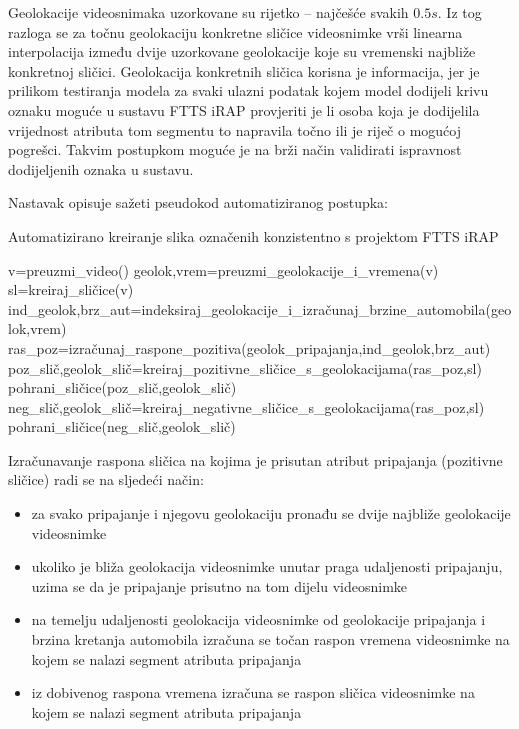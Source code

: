 \documentclass[times, utf8, diplomski, numeric]{fer}
\begin{document}
Geolokacije videosnimaka uzorkovane su rijetko -- najčešće svakih $0.5s$. 
Iz tog razloga se za točnu geolokaciju konkretne sličice videosnimke vrši linearna interpolacija između dvije uzorkovane geolokacije koje su vremenski najbliže konkretnoj sličici.
Geolokacija konkretnih sličica korisna je informacija, jer je prilikom testiranja modela za svaki ulazni podatak kojem model dodijeli krivu oznaku moguće u sustavu FTTS iRAP provjeriti je li osoba koja je dodijelila vrijednost atributa tom segmentu to napravila točno ili je riječ o mogućoj pogrešci. 
Takvim postupkom moguće je na brži način validirati ispravnost dodijeljenih oznaka u sustavu.

Nastavak opisuje sažeti pseudokod automatiziranog postupka:
\begin{algorithm}[H]
\caption{Automatizirano kreiranje slika označenih konzistentno s projektom FTTS iRAP}
\label{alg:dataset_creator}
\begin{algorithmic}
\STATE v=preuzmi\_video()
\STATE geolok,vrem=preuzmi\_geolokacije\_i\_vremena(v)
\STATE sl=kreiraj\_sličice(v)
\STATE ind\_geolok,brz\_aut=indeksiraj\_geolokacije\_i\_izračunaj\_brzine\_automobila(geolok,vrem)
\STATE ras\_poz=izračunaj\_raspone\_pozitiva(geolok\_pripajanja,ind\_geolok,brz\_aut)
\STATE poz\_slič,geolok\_slič=kreiraj\_pozitivne\_sličice\_s\_geolokacijama(ras\_poz,sl)
\STATE pohrani\_sličice(poz\_slič,geolok\_slič)
\STATE neg\_slič,geolok\_slič=kreiraj\_negativne\_sličice\_s\_geolokacijama(ras\_poz,sl)
\STATE pohrani\_sličice(neg\_slič,geolok\_slič)
\ENDWHILE
\end{algorithmic}
\end{algorithm}

\noindent Izračunavanje raspona sličica na kojima je prisutan atribut pripajanja (pozitivne sličice) radi se na sljedeći način:
\begin{itemize}
 \item za svako pripajanje i njegovu geolokaciju pronađu se dvije najbliže geolokacije videosnimke
 \item ukoliko je bliža geolokacija videosnimke unutar praga udaljenosti pripajanju, uzima se da je pripajanje prisutno na tom dijelu videosnimke
 \item na temelju udaljenosti geolokacija videosnimke od geolokacije pripajanja i brzina kretanja automobila izračuna se točan raspon vremena videosnimke na kojem se nalazi segment atributa pripajanja
 \item iz dobivenog raspona vremena izračuna se raspon sličica videosnimke na kojem se nalazi segment atributa pripajanja
\end{itemize}
\end{document}
